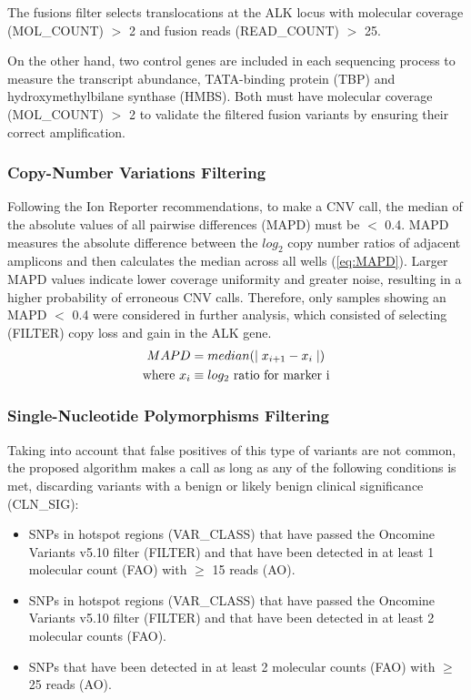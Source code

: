 The fusions filter selects translocations at the ALK locus with molecular coverage (MOL\_COUNT) $>$ 2 and fusion reads (READ\_COUNT) $>$ 25.

On the other hand, two control genes are included in each sequencing process to measure the transcript abundance, TATA-binding protein (TBP) and hydroxymethylbilane synthase (HMBS). Both must have molecular coverage (MOL\_COUNT) $>$ 2 to validate the filtered fusion variants by ensuring their correct amplification.

\subsubsection{Copy-Number Variations Filtering}

Following the Ion Reporter\texttrademark{} recommendations, to make a CNV call, the median of the absolute values of all pairwise differences (MAPD) must be $<$ 0.4. MAPD measures the absolute difference between the $log_2$ copy number ratios of adjacent amplicons and then calculates the median across all wells (\autoref{eq:MAPD}). Larger MAPD values indicate lower coverage uniformity and greater noise, resulting in a higher probability of erroneous CNV calls. Therefore, only samples showing an MAPD $<$ 0.4 were considered in further analysis, which consisted of selecting (FILTER) copy loss and gain in the ALK gene.
\begin{align} \label{eq:MAPD}
    MAPD &= median(\mid x_{i+1}-x_i \mid) \\
    \text{where}~  
    x_i &\equiv \text{$log_2$ ratio for marker i} \notag
\end{align}

\subsubsection{Single-Nucleotide Polymorphisms Filtering}

Taking into account that false positives of this type of variants are not common, the proposed algorithm makes a call as long as any of the following conditions is met, discarding variants with a benign or likely benign clinical significance (CLN\_SIG):
\begin{itemize}
    \item SNPs in hotspot regions (VAR\_CLASS) that have passed the Oncomine\texttrademark{} Variants v5.10 filter (FILTER) and that have been detected in at least 1 molecular count (FAO) with $\ge$ 15 reads (AO).
    \item SNPs in hotspot regions (VAR\_CLASS) that have passed the Oncomine\texttrademark{} Variants v5.10 filter (FILTER) and that have been detected in at least 2 molecular counts (FAO).
    \item SNPs that have been detected in at least 2 molecular counts (FAO) with $\ge$ 25 reads (AO).
\end{itemize}

